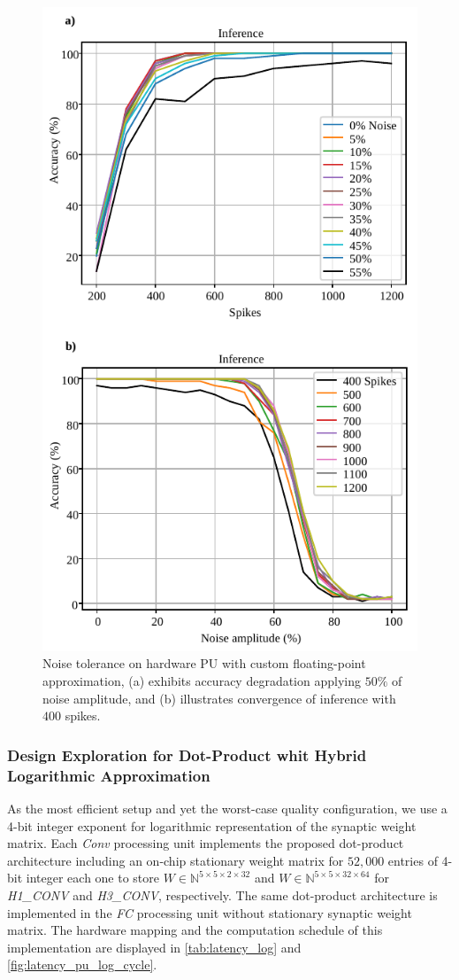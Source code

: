 \begin{figure}[b!]
	\centering
	\includegraphics[width=0.5\columnwidth]{./chapters/sbs_accelerator/figures/accuracy_vs_noise_pu_cfp(4-bit-exponent_1-bit-mantissa).pdf}
	\caption{Noise tolerance on hardware PU with custom floating-point approximation, (a) exhibits accuracy degradation applying $50\%$ of noise amplitude, and (b) illustrates convergence of inference with $400$ spikes.}
	\label{fig:accuracy_vs_noise_pu_cfp}
\end{figure}

\subsubsection{Design Exploration for Dot-Product whit Hybrid Logarithmic Approximation}
As the most efficient setup and yet the worst-case quality configuration, we use a 4-bit integer exponent for logarithmic representation of the synaptic weight matrix. Each \emph{Conv} processing unit implements the proposed dot-product architecture including an on-chip stationary weight matrix for $52,000$ entries of 4-bit integer each one to store $W\in\mathbb{N}^{5\times 5\times 2\times 32}$ and $W\in\mathbb{N}^{5\times 5\times 32\times 64}$ for \emph{H1\_CONV} and \emph{H3\_CONV}, respectively. The same dot-product architecture is implemented in the \emph{FC} processing unit without stationary synaptic weight matrix. The hardware mapping and the computation schedule of this implementation are displayed in \ref{tab:latency_log} and \ref{fig:latency_pu_log_cycle}.

